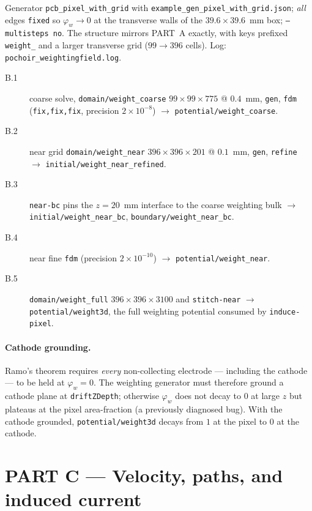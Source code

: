 \documentclass[11pt]{article}
\newcommand{\key}[1]{\texttt{#1}}
\newcommand{\cmd}[1]{\texttt{#1}}
\begin{document}
Generator \cmd{pcb\_pixel\_with\_grid} with
\cmd{example\_gen\_pixel\_with\_grid.json}; \emph{all} edges
\texttt{fixed} so $\varphi_w\to0$ at the transverse walls of the
$39.6\times39.6$~mm box; \texttt{--multisteps no}.  The structure mirrors
PART~A exactly, with keys prefixed \key{weight\_} and a larger transverse
grid ($99\to396$ cells).  Log: \texttt{pochoir\_weightingfield.log}.

\begin{description}
  \item[B.1] coarse solve, \key{domain/weight\_coarse}
    $99\times99\times775$ @ $0.4$~mm, \cmd{gen}, \cmd{fdm}
    (\texttt{fix,fix,fix}, precision $2\times10^{-8}$) $\to$
    \key{potential/weight\_coarse}.
  \item[B.2] near grid \key{domain/weight\_near} $396\times396\times201$ @
    $0.1$~mm, \cmd{gen}, \cmd{refine} $\to$
    \key{initial/weight\_near\_refined}.
  \item[B.3] \cmd{near-bc} pins the $z=20$~mm interface to the coarse
    weighting bulk $\to$ \key{initial/weight\_near\_bc},
    \key{boundary/weight\_near\_bc}.
  \item[B.4] near fine \cmd{fdm} (precision $2\times10^{-10}$) $\to$
    \key{potential/weight\_near}.
  \item[B.5] \key{domain/weight\_full} $396\times396\times3100$ and
    \cmd{stitch-near} $\to$ \key{potential/weight3d}, the full weighting
    potential consumed by \cmd{induce-pixel}.
\end{description}

\paragraph{Cathode grounding.} Ramo's theorem requires \emph{every}
non-collecting electrode --- including the cathode --- to be held at
$\varphi_w=0$.  The weighting generator must therefore ground a cathode
plane at \texttt{driftZDepth}; otherwise $\varphi_w$ does not decay to $0$
at large $z$ but plateaus at the pixel area-fraction (a previously
diagnosed bug).  With the cathode grounded, \key{potential/weight3d}
decays from $1$ at the pixel to $0$ at the cathode.

\section{PART C --- Velocity, paths, and induced current}
\end{document}
